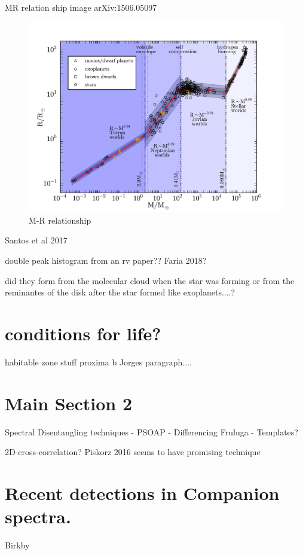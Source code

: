 MR relation ship image arXiv:1506.05097~\citet{chen_probabilistic_2016}

\begin{figure}
    \centering
    \includegraphics[width=0.4\linewidth]{./figures/introduction/mass_radius_relation.pdf}
    \caption{M-R relationship~\citet{chen_probabilistic_2016}}
    \label{fig:mass_radius_relation}
\end{figure}

Santos et al 2017 


double peak histogram from an rv paper?? Faria 2018?


did they form from the molecular cloud when the star was forming or from the reminantes of the disk after the star formed like exoplanets....?


\section{ conditions for life?}
habitable zone stuff
proxima b
Jorges paragraph.... 

\section{Main Section 2}


Spectral Disentangling techniques
- PSOAP
- Differencing Fruluga
- Templates?


2D-cross-correlation?   Piskorz 2016 seems to have promising technique


\section{Recent detections in Companion spectra.}

Birkby


